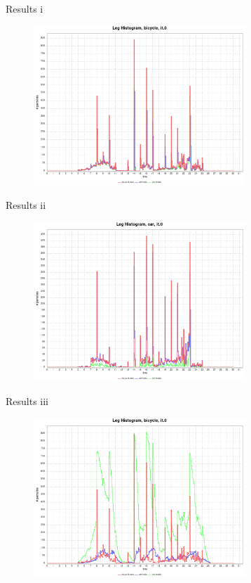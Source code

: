 \documentclass[10pt, aspectratio=169]{beamer}
\begin{document}
\begin{frame}{Results i}
    \begin{center}
        \begin{figure}
            \centering
            \includegraphics[height=6cm, keepaspectratio]{images/build_city/results/0.legHistogram_bicycle.png}
        \end{figure}
    \end{center}
\end{frame}

\begin{frame}{Results ii}
    \begin{center}
        \begin{figure}
            \centering
            \includegraphics[height=6cm, keepaspectratio]{images/build_city/results/0.legHistogram_car.png}
        \end{figure}
    \end{center}
\end{frame}

\begin{frame}{Results iii}
    \begin{center}
        \begin{figure}
            \centering
            \includegraphics[height=6cm]{images/build_city/results/0.legHistogram_slow_bicycle.png}
        \end{figure}
    \end{center}
\end{frame}
\end{document}
